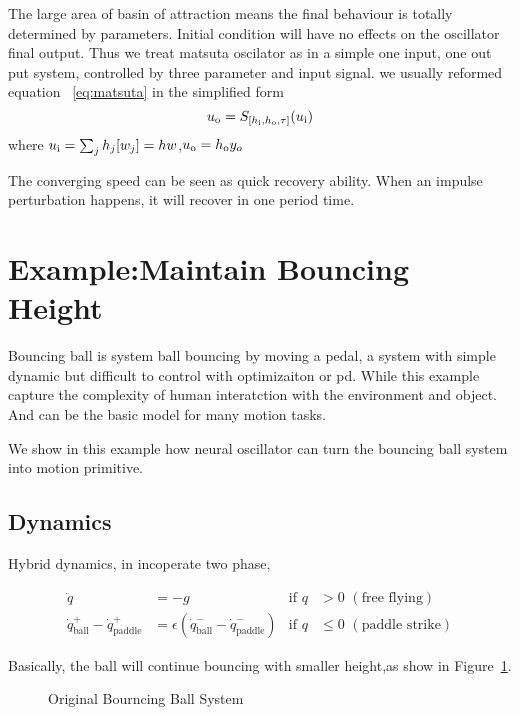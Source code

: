 The large area of basin of attraction means the final behaviour is totally determined by parameters. 
Initial condition will have no effects on the oscillator final output. 
Thus we treat matsuta oscilator as in a simple one input, one out put system, controlled by three parameter and input signal. 
we usually reformed equation ~\ref{eq:matsuta} in the simplified form
\begin{equation}
\label{eq:simplematsuta}
u_{\mathrm{o}}=S_{[h_{\mathrm{i}},h_{\mathrm{o}},\tau]}(u_{\mathrm{i}})
\end{equation}
where $u_{\mathrm{i}}=\sum_{j}h_{j}[w_{j}]=hw$,$u_{\mathrm{o}}=h_{\mathrm{o}} y_{o}$





The converging speed can be seen as quick recovery ability.
When an impulse perturbation happens, it will recover in one period time.


\section{Example:Maintain Bouncing Height}

Bouncing ball is system ball bouncing by moving a pedal, a system with simple dynamic but difficult to control with optimizaiton or pd. 
While this example capture the complexity of human interatction with the environment and object. 
And can be the basic model for many motion tasks.

We show in this example how neural oscillator can turn the bouncing ball system into motion primitive.
\subsection*{Dynamics}
Hybrid dynamics, in incoperate two phase, 
 

\begin{align}
\ddot{q}&=-g&\mathrm{if}\,\,q &> 0\,\,\mathrm{(free\,\,flying)} \nonumber\\
\dot{q}^{+}_{\mathrm{ball}} - \dot{q}^{+}_{\mathrm{paddle}} &=  \epsilon(\dot{q}^{-}_{\mathrm{ball}} - \dot{q}^{-}_{\mathrm{paddle}})&\mathrm{if}\,\,q &\leq 0\,\,\mathrm{(paddle\,\,strike)}\nonumber
\end{align}

Basically, the ball will continue bouncing with smaller height,as show in Figure~\ref{fig:bborg}.

\begin{figure}[h]
\begin{center}
	
\end{center}
\caption{Original Bourncing Ball System}
\label{fig:bborg}
\end{figure}



